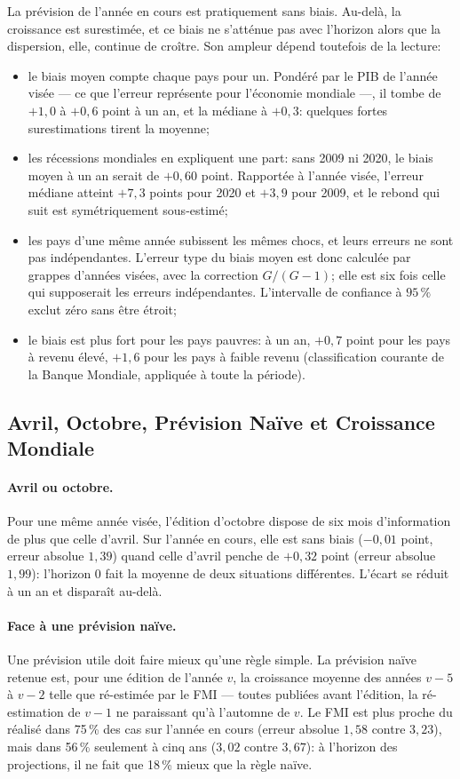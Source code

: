 \documentclass[11pt,a4paper]{article}
\begin{document}
La prévision de l'année en cours est pratiquement sans biais. Au-delà, la croissance est surestimée, et ce biais ne s'atténue pas avec l'horizon alors que la dispersion, elle, continue de croître. Son ampleur dépend toutefois de la lecture:
\begin{itemize}
    \item le biais moyen compte chaque pays pour un. Pondéré par le PIB de l'année visée --- ce que l'erreur représente pour l'économie mondiale ---, il tombe de $+1{,}0$ à $+0{,}6$ point à un an, et la médiane à $+0{,}3$: quelques fortes surestimations tirent la moyenne;
    \item les récessions mondiales en expliquent une part: sans 2009 ni 2020, le biais moyen à un an serait de $+0{,}60$ point. Rapportée à l'année visée, l'erreur médiane atteint $+7{,}3$ points pour 2020 et $+3{,}9$ pour 2009, et le rebond qui suit est symétriquement sous-estimé;
    \item les pays d'une même année subissent les mêmes chocs, et leurs erreurs ne sont pas indépendantes. L'erreur type du biais moyen est donc calculée par grappes d'années visées, avec la correction $G/(G-1)$; elle est six fois celle qui supposerait les erreurs indépendantes. L'intervalle de confiance à $95\,\%$ exclut zéro sans être étroit;
    \item le biais est plus fort pour les pays pauvres: à un an, $+0{,}7$ point pour les pays à revenu élevé, $+1{,}6$ pour les pays à faible revenu (classification courante de la Banque Mondiale, appliquée à toute la période).
\end{itemize}

\subsection{Avril, Octobre, Prévision Naïve et Croissance Mondiale}
\paragraph{Avril ou octobre.} Pour une même année visée, l'édition d'octobre dispose de six mois d'information de plus que celle d'avril. Sur l'année en cours, elle est sans biais ($-0{,}01$ point, erreur absolue $1{,}39$) quand celle d'avril penche de $+0{,}32$ point (erreur absolue $1{,}99$): l'horizon 0 fait la moyenne de deux situations différentes. L'écart se réduit à un an et disparaît au-delà.

\paragraph{Face à une prévision naïve.} Une prévision utile doit faire mieux qu'une règle simple. La prévision naïve retenue est, pour une édition de l'année $v$, la croissance moyenne des années $v-5$ à $v-2$ telle que ré-estimée par le FMI --- toutes publiées avant l'édition, la ré-estimation de $v-1$ ne paraissant qu'à l'automne de $v$. Le FMI est plus proche du réalisé dans 75\,\% des cas sur l'année en cours (erreur absolue $1{,}58$ contre $3{,}23$), mais dans 56\,\% seulement à cinq ans ($3{,}02$ contre $3{,}67$): à l'horizon des projections, il ne fait que 18\,\% mieux que la règle naïve.
\end{document}

